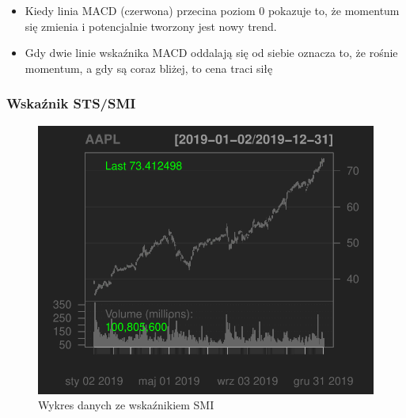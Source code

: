 \documentclass[12pt, a4paper]{article}\usepackage[]{graphicx}\usepackage[]{color}
\makeatletter
\def\maxwidth{ %
  \ifdim\Gin@nat@width>\linewidth
    \linewidth
  \else
    \Gin@nat@width
  \fi
}
\newenvironment{knitrout}{}{} %
\makeatother
\begin{document}
\begin{itemize}

\item Kiedy linia MACD (czerwona) przecina poziom 0 pokazuje to, że momentum się zmienia i potencjalnie tworzony jest nowy trend. 

\item Gdy dwie linie wskaźnika MACD oddalają się od siebie oznacza to, że rośnie momentum, a gdy są coraz bliżej, to cena traci siłę

\end{itemize}

\subsubsection{Wskaźnik STS/SMI}


\begin{knitrout}
\color{fgcolor}\begin{figure}[H]

{\centering \includegraphics[width=\maxwidth]{figure/unnamed-chunk-4-1} 

}

\caption[Wykres danych ze wskaźnikiem SMI]{Wykres danych ze wskaźnikiem SMI}\label{fig:unnamed-chunk-4-1}
\end{figure}

\begin{figure}[H]


\end{figure}
\end{knitrout}
\end{document}

